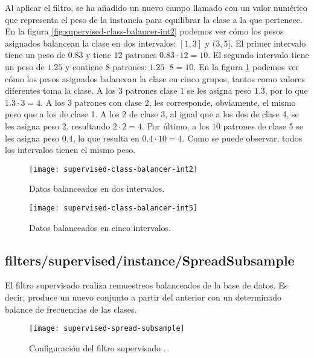 Al aplicar el filtro, se ha añadido un nuevo campo llamado  con un valor numérico que representa el peso de la instancia para equilibrar la clase a la que pertenece. En la figura \ref{fig:supervised-class-balancer-int2} podemos ver cómo los pesos asignados balancean la clase en dos intervalos: $[1,3]$ y $(3,5]$. El primer intervalo tiene un peso de $0.8\overline{3}$ y tiene 12 patrones $0.8\overline{3}\cdot 12 = 10$. El segundo intervalo tiene un peso de $1.25$ y contiene 8 patrones: $1.25\cdot 8=10$. En la figura \ref{fig:supervised-class-balancer-int5} podemos ver cómo los pesos asignados balancean la clase en cinco grupos, tantos como valores diferentes toma la clase. A los $3$ patrones clase $1$ se les asigna peso $1.\overline{3}$, por lo que $1.\overline{3}\cdot 3 = 4$. A los 3 patrones con clase 2, les corresponde, obviamente, el mismo peso que a los de clase 1. A los 2 de clase 3, al igual que a los dos de clase 4, se les asigna peso $2$, resultando $2\cdot2=4$. Por último, a los $10$ patrones de clase 5 se les asigna peso $0.4$, lo que resulta en $0.4\cdot10=4$. Como se puede observar, todos los intervalos tienen el mismo peso.

\begin{figure}[H]
    \centering
    \begin{minipage}{0.50\textwidth}
        \centering
        \texttt{[image: supervised-class-balancer-int2]}
        \caption{Datos balanceados en dos intervalos.}
        \label{fig:supervised-class-balancer-int2}
    \end{minipage}\hfill
    \begin{minipage}{0.50\textwidth}
        \centering
        \texttt{[image: supervised-class-balancer-int5]}
        \caption{Datos balanceados en cinco intervalos.}
        \label{fig:supervised-class-balancer-int5}
    \end{minipage}
\end{figure}

\subsection{filters/supervised/instance/SpreadSubsample}
El filtro supervisado  realiza remuestreos balanceados de la base de datos. Es decir, produce un nuevo conjunto a partir del anterior con un determinado balance de frecuencias de las clases.


\begin{figure}[H]
    \centering
    \texttt{[image: supervised-spread-subsample]}
    \caption{Configuración del filtro supervisado .}
    \label{fig:supervised-spread-subsample}
\end{figure}

